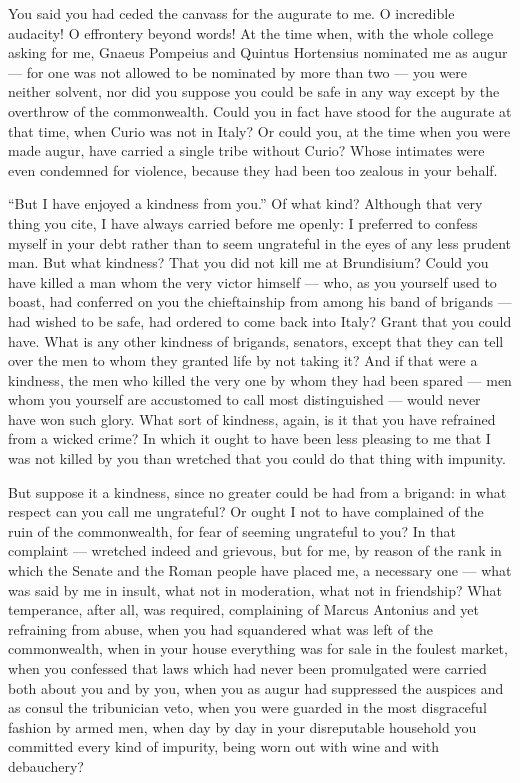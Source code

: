  You said you had ceded the canvass for the augurate to me. O incredible audacity! O effrontery beyond words! At the time when, with the whole college asking for me, Gnaeus Pompeius and Quintus Hortensius nominated me as augur --- for one was not allowed to be nominated by more than two --- you were neither solvent, nor did you suppose you could be safe in any way except by the overthrow of the commonwealth. Could you in fact have stood for the augurate at that time, when Curio was not in Italy? Or could you, at the time when you were made augur, have carried a single tribe without Curio? Whose intimates were even condemned for violence, because they had been too zealous in your behalf.

 ``But I have enjoyed a kindness from you.'' Of what kind? Although that very thing you cite, I have always carried before me openly: I preferred to confess myself in your debt rather than to seem ungrateful in the eyes of any less prudent man. But what kindness? That you did not kill me at Brundisium? Could you have killed a man whom the very victor himself --- who, as you yourself used to boast, had conferred on you the chieftainship from among his band of brigands --- had wished to be safe, had ordered to come back into Italy? Grant that you could have. What is any other kindness of brigands, senators, except that they can tell over the men to whom they granted life by not taking it? And if that were a kindness, the men who killed the very one by whom they had been spared --- men whom you yourself are accustomed to call most distinguished --- would never have won such glory. What sort of kindness, again, is it that you have refrained from a wicked crime? In which it ought to have been less pleasing to me that I was not killed by you than wretched that you could do that thing with impunity.

 But suppose it a kindness, since no greater could be had from a brigand: in what respect can you call me ungrateful? Or ought I not to have complained of the ruin of the commonwealth, for fear of seeming ungrateful to you? In that complaint --- wretched indeed and grievous, but for me, by reason of the rank in which the Senate and the Roman people have placed me, a necessary one --- what was said by me in insult, what not in moderation, what not in friendship? What temperance, after all, was required, complaining of Marcus Antonius and yet refraining from abuse, when you had squandered what was left of the commonwealth, when in your house everything was for sale in the foulest market, when you confessed that laws which had never been promulgated were carried both about you and by you, when you as augur had suppressed the auspices and as consul the tribunician veto, when you were guarded in the most disgraceful fashion by armed men, when day by day in your disreputable household you committed every kind of impurity, being worn out with wine and with debauchery?

